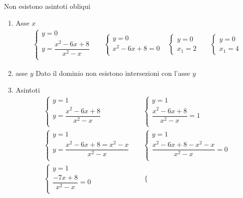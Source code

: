 \begin{exercise}
\begin{itemize}
\begin{enumerate}
		Non esistono asintoti obliqui
	\end{enumerate}
	\begin{enumerate}
		\item Asse $x$
		\begin{align*}
		&\begin{cases}
		y=0\\
		y=\dfrac{x^2-6x+8}{x^2-x}\\
		\end{cases}
		&&\begin{cases}
		y=0\\
		x^2-6x+8=0\\
		\end{cases}
		&\begin{cases}
		y=0\\
		x_1=2
		\end{cases}&
			&\begin{cases}
		y=0\\
		x_1=4
		\end{cases}
		\end{align*}
		\item asse $y$
	Dato il dominio non esistono intersezioni con l'asse $y$
		\item Asintoti
		\begin{align*}
			&\begin{cases}
		y=1\\
		y=\dfrac{x^2-6x+8}{x^2-x}\\
		\end{cases}
		&&\begin{cases}
		y=1\\
		\dfrac{x^2-6x+8}{x^2-x}=1\\
		\end{cases}\\
		&\begin{cases}
	y=1\\
	y=\dfrac{x^2-6x+8=x^2-x}{x^2-x}\\
	\end{cases}
	&&\begin{cases}
	y=1\\
	\dfrac{x^2-6x+8-x^2-x}{x^2-x}=0\\
	\end{cases}\\	
	&\begin{cases}
	y=1\\
	\dfrac{-7x+8}{x^2-x}=0\\
	\end{cases}
	&&\begin{cases}

\end{cases}
\end{align*}
\end{enumerate}
\end{itemize}
\end{exercise}
